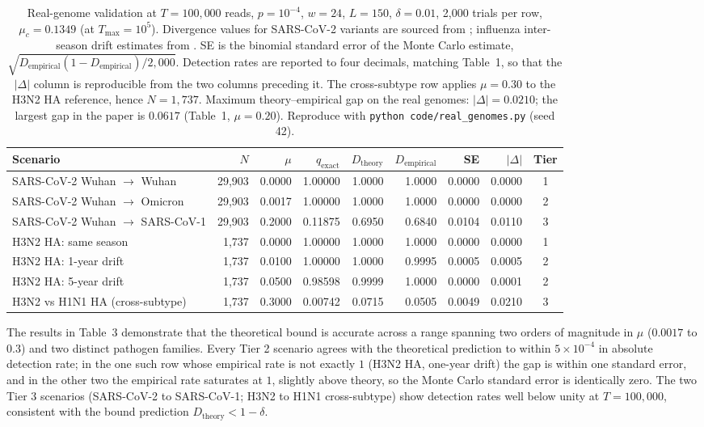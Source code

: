 \documentclass[12pt]{article}
\theoremstyle{definition}
\theoremstyle{plain}
\begin{document}
\begin{table}[!ht]
\centering
\footnotesize
\setlength{\tabcolsep}{3.5pt}
\begin{tabular}{lrrrrrrrc}
\toprule
Scenario & $N$ & $\mu$ & $q_{\mathrm{exact}}$ & $D_{\mathrm{theory}}$ & $D_{\mathrm{empirical}}$ & SE & $|\Delta|$ & Tier \\
\midrule
SARS-CoV-2 Wuhan $\to$ Wuhan    & 29,903 & 0.0000 & 1.00000 & 1.0000 & 1.0000 & 0.0000 & 0.0000 & 1 \\
SARS-CoV-2 Wuhan $\to$ Omicron  & 29,903 & 0.0017 & 1.00000 & 1.0000 & 1.0000 & 0.0000 & 0.0000 & 2 \\
SARS-CoV-2 Wuhan $\to$ SARS-CoV-1 & 29,903 & 0.2000 & 0.11875 & 0.6950 & 0.6840 & 0.0104 & 0.0110 & 3 \\
H3N2 HA: same season            & 1,737  & 0.0000 & 1.00000 & 1.0000 & 1.0000 & 0.0000 & 0.0000 & 1 \\
H3N2 HA: 1-year drift           & 1,737  & 0.0100 & 1.00000 & 1.0000 & 0.9995 & 0.0005 & 0.0005 & 2 \\
H3N2 HA: 5-year drift           & 1,737  & 0.0500 & 0.98598 & 0.9999 & 1.0000 & 0.0000 & 0.0001 & 2 \\
H3N2 vs H1N1 HA (cross-subtype) & 1,737  & 0.3000 & 0.00742 & 0.0715 & 0.0505 & 0.0049 & 0.0210 & 3 \\
\bottomrule
\end{tabular}
\caption{Real-genome validation at $T=100{,}000$ reads, $p=10^{-4}$, $w=24$,
$L=150$, $\delta=0.01$, 2,000 trials per row, $\mu_c=0.1349$ (at
$T_{\max}=10^5$). Divergence values for SARS-CoV-2 variants are sourced from
\cite{wu2020,viana2022}; influenza inter-season drift estimates from
\cite{bedford2010}. SE is the binomial standard error of the Monte Carlo
estimate, $\sqrt{D_{\mathrm{empirical}}(1-D_{\mathrm{empirical}})/2{,}000}$.
Detection rates are reported to four decimals, matching Table~1, so that the
$|\Delta|$ column is reproducible from the two columns preceding it. The
cross-subtype row applies $\mu=0.30$ to the H3N2 HA reference, hence
$N=1{,}737$. Maximum theory--empirical gap on the real genomes:
$|\Delta|=0.0210$; the largest gap in the paper is $0.0617$ (Table~1,
$\mu=0.20$). Reproduce with \texttt{python code/real\_genomes.py} (seed 42).}
\end{table}

The results in Table~3 demonstrate that the theoretical bound is accurate
across a range spanning two orders of magnitude in $\mu$ ($0.0017$ to $0.3$)
and two distinct pathogen families. Every Tier 2 scenario agrees with the
theoretical prediction to within $5\times10^{-4}$ in absolute detection
rate; in the one such row whose empirical rate is not exactly $1$ (H3N2 HA,
one-year drift) the gap is within one standard error, and in the other two
the empirical rate saturates at $1$, slightly above theory, so the Monte
Carlo standard error is identically zero. The two Tier 3 scenarios (SARS-CoV-2 to SARS-CoV-1; H3N2 to H1N1
cross-subtype) show detection rates well below unity at $T=100{,}000$,
consistent with the bound prediction $D_{\mathrm{theory}}<1-\delta$.
\end{document}
